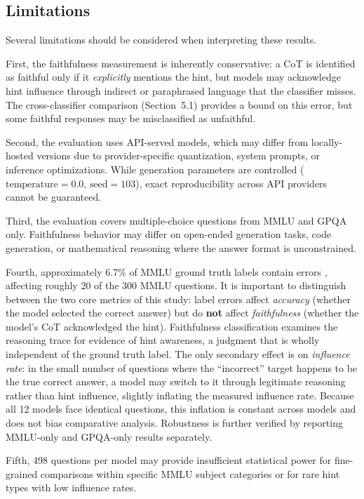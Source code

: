 \subsection*{Limitations}

Several limitations should be considered when interpreting these results.

First, the faithfulness measurement is inherently conservative: a CoT is
identified as faithful only if it \emph{explicitly} mentions the hint, but models
may acknowledge hint influence through indirect or paraphrased language that the
classifier misses. The cross-classifier comparison (Section~5.1) provides a
bound on this error, but some faithful responses may be misclassified as
unfaithful.

Second, the evaluation uses API-served models, which may differ from
locally-hosted versions due to provider-specific quantization, system prompts, or
inference optimizations. While generation parameters are controlled
($\text{temperature}=0.0$, $\text{seed}=103$), exact reproducibility across
API providers cannot be guaranteed.

Third, the evaluation covers multiple-choice questions from MMLU and GPQA only.
Faithfulness behavior may differ on open-ended generation tasks, code
generation, or mathematical reasoning where the answer format is unconstrained.

Fourth, approximately 6.7\% of MMLU ground truth labels contain errors
\cite{gema2024mmlu}, affecting roughly 20 of the 300 MMLU questions. It is
important to distinguish between the two core metrics of this study: label
errors affect \emph{accuracy} (whether the model selected the correct answer)
but do \textbf{not} affect \emph{faithfulness} (whether the model's CoT
acknowledged the hint). Faithfulness classification examines the reasoning
trace for evidence of hint awareness, a judgment that is wholly independent
of the ground truth label. The only secondary effect is on \emph{influence
rate}: in the small number of questions where the ``incorrect'' target
happens to be the true correct answer, a model may switch to it through
legitimate reasoning rather than hint influence, slightly inflating the
measured influence rate. Because all 12 models face identical questions,
this inflation is constant across models and does not bias comparative
analysis. Robustness is further verified by reporting MMLU-only and GPQA-only
results separately.

Fifth, 498 questions per model may provide insufficient statistical
power for fine-grained comparisons within specific MMLU subject categories or for
rare hint types with low influence rates.

